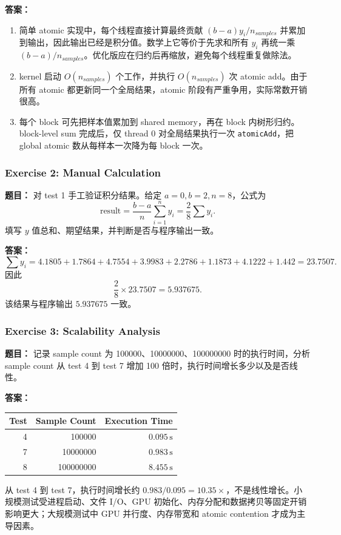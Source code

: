 \documentclass[10pt,a4paper]{article}
\begin{document}
\noindent\textbf{答案：}
\begin{enumerate}[label=\arabic*.]
\item 简单 atomic 实现中，每个线程直接计算最终贡献 $(b-a)y_i/n_{samples}$ 并累加到输出，因此输出已经是积分值。数学上它等价于先求和所有 $y_i$ 再统一乘 $(b-a)/n_{samples}$。优化版应在归约后再缩放，避免每个线程重复做除法。
\item kernel 启动 $O(n_{samples})$ 个工作，并执行 $O(n_{samples})$ 次 atomic add。由于所有 atomic 都更新同一个全局结果，atomic 阶段有严重争用，实际常数开销很高。
\item 每个 block 可先把样本值累加到 shared memory，再在 block 内树形归约。block-level sum 完成后，仅 thread 0 对全局结果执行一次 \texttt{atomicAdd}，把 global atomic 数从每样本一次降为每 block 一次。
\end{enumerate}

\subsubsection{Exercise 2: Manual Calculation}
\noindent\textbf{题目：} 对 test 1 手工验证积分结果。给定 $a=0,b=2,n=8$，公式为
\[
\mathrm{result}=\frac{b-a}{n}\sum_{i=1}^{n}y_i=\frac{2}{8}\sum y_i.
\]
填写 $y$ 值总和、期望结果，并判断是否与程序输出一致。

\noindent\textbf{答案：}
\[
\sum y_i=4.1805+1.7864+4.7554+3.9983+2.2786+1.1873+4.1222+1.442=23.7507.
\]
因此
\[
\frac{2}{8}\times23.7507=5.937675.
\]
该结果与程序输出 $5.937675$ 一致。

\subsubsection{Exercise 3: Scalability Analysis}
\noindent\textbf{题目：} 记录 sample count 为 100000、10000000、100000000 时的执行时间，分析 sample count 从 test 4 到 test 7 增加 100 倍时，执行时间增长多少以及是否线性。

\noindent\textbf{答案：}
\begin{center}
\small
\begin{tabular}{rrr}
\toprule
Test & Sample Count & Execution Time \\
\midrule
4 & 100000 & $0.095\,\mathrm{s}$ \\
7 & 10000000 & $0.983\,\mathrm{s}$ \\
8 & 100000000 & $8.455\,\mathrm{s}$ \\
\bottomrule
\end{tabular}
\end{center}
从 test 4 到 test 7，执行时间增长约 $0.983/0.095=10.35\times$，不是线性增长。小规模测试受进程启动、文件 I/O、GPU 初始化、内存分配和数据拷贝等固定开销影响更大；大规模测试中 GPU 并行度、内存带宽和 atomic contention 才成为主导因素。
\end{document}
